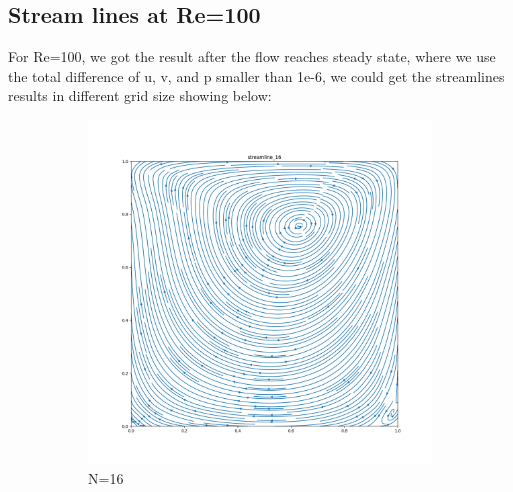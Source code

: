 \documentclass[12pt]{article}
\begin{document}
\subsection{Stream lines at Re=100}
For Re=100, we got the result after the flow reaches steady state, where we use the total difference of u, v, and p smaller than 1e-6, we could get the streamlines results in different grid size showing below:
\begin{figure}[H]
    \centering
    \begin{subfigure}[b]{0.48\linewidth}
        \includegraphics[width=\linewidth]{figures/Re=100_result/streamline_16.png}
        \caption{N=16}
    \end{subfigure}
    \hspace{-5mm} %
    \begin{subfigure}[b]{0.48\linewidth}

\end{subfigure}
\end{figure}
\end{document}
